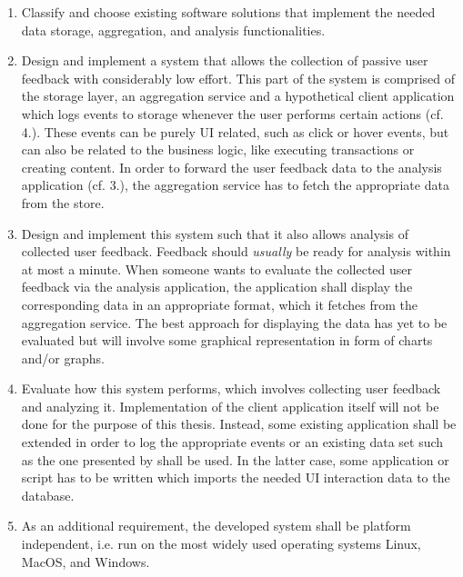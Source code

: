 \begin{enumerate}
\item Classify and choose existing software solutions that implement the needed data storage, aggregation, and analysis functionalities.
\item Design and implement a system that allows the collection of passive user feedback with considerably low effort.
This part of the system is comprised of the storage layer, an aggregation service and a hypothetical client application which logs events to storage whenever the user performs certain actions (cf. 4.).
These events can be purely UI related, such as click or hover events, but can also be related to the business logic, like executing transactions or creating content.
In order to forward the user feedback data to the analysis application (cf. 3.), the aggregation service has to fetch the appropriate data from the store.
\item Design and implement this system such that it also allows analysis of collected user feedback.
Feedback should \emph{usually} be ready for analysis within at most a minute.
When someone wants to evaluate the collected user feedback via the analysis application, the application shall display the corresponding data in an appropriate format, which it fetches from the aggregation service.
The best approach for displaying the data has yet to be evaluated but will involve some graphical representation in form of charts and/or graphs.
\item Evaluate how this system performs, which involves collecting user feedback and analyzing it.
Implementation of the client application itself will not be done for the purpose of this thesis.
Instead, some existing application shall be extended in order to log the appropriate events or an existing data set such as the one presented by \citet{Deka:2017:Rico} shall be used.
In the latter case, some application or script has to be written which imports the needed UI interaction data to the database.
\item As an additional requirement, the developed system shall be platform independent, i.e. run on the most widely used operating systems Linux, MacOS, and Windows.
\end{enumerate}

